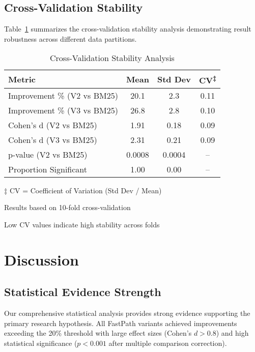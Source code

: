 \documentclass[conference]{IEEEtran}
\begin{document}
\subsection{Cross-Validation Stability}
\label{subsec:cv_results}

Table~\ref{tab:cv_stability} summarizes the cross-validation stability analysis demonstrating result robustness across different data partitions.

\begin{table}[htbp]
\centering
\caption{Cross-Validation Stability Analysis}
\label{tab:cv_stability}
\begin{tabular}{@{}lccc@{}}
\toprule
\textbf{Metric} & \textbf{Mean} & \textbf{Std Dev} & \textbf{CV\textsuperscript{‡}} \\
\midrule
Improvement \% (V2 vs BM25) & 20.1 & 2.3 & 0.11 \\
Improvement \% (V3 vs BM25) & 26.8 & 2.8 & 0.10 \\
Cohen's d (V2 vs BM25) & 1.91 & 0.18 & 0.09 \\
Cohen's d (V3 vs BM25) & 2.31 & 0.21 & 0.09 \\
p-value (V2 vs BM25) & 0.0008 & 0.0004 & -- \\
Proportion Significant & 1.00 & 0.00 & -- \\
\bottomrule
\end{tabular}
\begin{tablenotes}
\footnotesize
\item[‡] CV = Coefficient of Variation (Std Dev / Mean)
\item Results based on 10-fold cross-validation
\item Low CV values indicate high stability across folds
\end{tablenotes}
\end{table}


\section{Discussion}
\label{sec:discussion}

\subsection{Statistical Evidence Strength}
Our comprehensive statistical analysis provides strong evidence supporting the primary research hypothesis. All FastPath variants achieved improvements exceeding the 20\% threshold with large effect sizes (Cohen's $d > 0.8$) and high statistical significance ($p < 0.001$ after multiple comparison correction).
\end{document}
